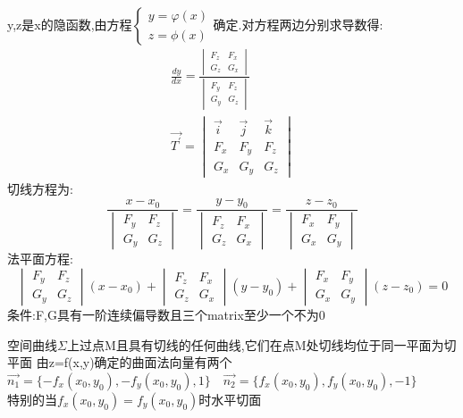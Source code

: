 \documentclass[10pt, a4paper, oneside]{ctexart}
\begin{document}
\begin{sloppypar}
	y,z是x的隐函数,由方程$\begin{cases}
			y=\varphi(x) \\
			z=\phi(x)
		\end{cases}$确定.对方程两边分别求导数得:\begin{gather*}
		\frac{dy}{dx}=\frac{\begin{vmatrix}
				F_z & F_x \\
				G_z & G_x
			\end{vmatrix}}{\begin{vmatrix}
				F_y & F_z \\
				G_y & G_z
			\end{vmatrix}}\\
		\overrightarrow{T^{\prime}} = \begin{vmatrix}
			\overrightarrow{i} & \overrightarrow{j} & \overrightarrow{k} \\
			F_x                & F_y                & F_z                \\
			G_x                & G_y                & G_z
		\end{vmatrix}
	\end{gather*}
	切线方程为:
	$$
		\frac{x-x_0}{\begin{vmatrix}
				F_y & F_z \\
				G_y & G_z
			\end{vmatrix}}=\frac{y-y_0}{\begin{vmatrix}
				F_z & F_x \\
				G_z & G_x
			\end{vmatrix}}=\frac{z-z_0}{\begin{vmatrix}
				F_x & F_y \\
				G_x & G_y
			\end{vmatrix}}
	$$
	法平面方程:$$
		\begin{vmatrix}
			F_y & F_z \\
			G_y & G_z
		\end{vmatrix}(x-x_0)+\begin{vmatrix}
			F_z & F_x \\
			G_z & G_x
		\end{vmatrix}(y-y_0)+\begin{vmatrix}
			F_x & F_y \\
			G_x & G_y
		\end{vmatrix}(z-z_0)=0
	$$
	条件:F,G具有一阶连续偏导数且三个matrix至少一个不为0

	空间曲线$\Sigma$上过点M且具有切线的任何曲线,它们在点M处切线均位于同一平面为切平面
	由z=f(x,y)确定的曲面法向量有两个$\overrightarrow{n_1}=\{-f_x(x_0, y_0), -f_y(x_0, y_0),1\}\quad\overrightarrow{n_2}=\{f_x(x_0, y_0), f_y(x_0, y_0),-1\}$\\
	特别的当$f_x(x_0, y_0)=f_y(x_0, y_0)$时水平切面


\end{sloppypar}
\end{document}
